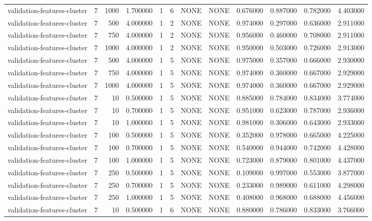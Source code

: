 \begin{tabular}{lrrrllllrrrr}
validation-features-cluster & 7 & 1000 & 1.700000 & 1 & 6 & NONE & NONE & 0.676000 & 0.887000 & 0.782000 & 4.403000 \\
validation-features-cluster & 7 & 500 & 4.000000 & 1 & 2 & NONE & NONE & 0.974000 & 0.297000 & 0.636000 & 2.911000 \\
validation-features-cluster & 7 & 750 & 4.000000 & 1 & 2 & NONE & NONE & 0.956000 & 0.460000 & 0.708000 & 2.911000 \\
validation-features-cluster & 7 & 1000 & 4.000000 & 1 & 2 & NONE & NONE & 0.950000 & 0.503000 & 0.726000 & 2.913000 \\
validation-features-cluster & 7 & 500 & 4.000000 & 1 & 5 & NONE & NONE & 0.975000 & 0.357000 & 0.666000 & 2.930000 \\
validation-features-cluster & 7 & 750 & 4.000000 & 1 & 5 & NONE & NONE & 0.974000 & 0.360000 & 0.667000 & 2.929000 \\
validation-features-cluster & 7 & 1000 & 4.000000 & 1 & 5 & NONE & NONE & 0.974000 & 0.360000 & 0.667000 & 2.929000 \\
validation-features-cluster & 7 & 10 & 0.500000 & 1 & 5 & NONE & NONE & 0.885000 & 0.784000 & 0.834000 & 3.774000 \\
validation-features-cluster & 7 & 10 & 0.700000 & 1 & 5 & NONE & NONE & 0.951000 & 0.623000 & 0.787000 & 2.936000 \\
validation-features-cluster & 7 & 10 & 1.000000 & 1 & 5 & NONE & NONE & 0.981000 & 0.306000 & 0.643000 & 2.933000 \\
validation-features-cluster & 7 & 100 & 0.500000 & 1 & 5 & NONE & NONE & 0.352000 & 0.978000 & 0.665000 & 4.225000 \\
validation-features-cluster & 7 & 100 & 0.700000 & 1 & 5 & NONE & NONE & 0.540000 & 0.944000 & 0.742000 & 4.428000 \\
validation-features-cluster & 7 & 100 & 1.000000 & 1 & 5 & NONE & NONE & 0.723000 & 0.879000 & 0.801000 & 4.437000 \\
validation-features-cluster & 7 & 250 & 0.500000 & 1 & 5 & NONE & NONE & 0.109000 & 0.997000 & 0.553000 & 3.877000 \\
validation-features-cluster & 7 & 250 & 0.700000 & 1 & 5 & NONE & NONE & 0.233000 & 0.989000 & 0.611000 & 4.298000 \\
validation-features-cluster & 7 & 250 & 1.000000 & 1 & 5 & NONE & NONE & 0.408000 & 0.968000 & 0.688000 & 4.456000 \\
validation-features-cluster & 7 & 10 & 0.500000 & 1 & 6 & NONE & NONE & 0.880000 & 0.786000 & 0.833000 & 3.766000 \\

\end{tabular}
